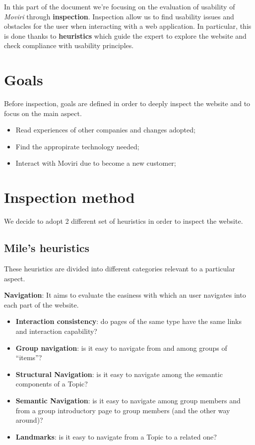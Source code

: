 In this part of the document we're focusing on the evaluation of usability of \textit{Moviri} through \textbf{inspection}. Inspection allow us to find usability issues and obstacles for the user when interacting with a web application. In particular, this is done thanks to \textbf{heuristics} which guide the expert to explore the website and check compliance with usability principles.
\section{Goals}
Before inspection, goals are defined in order to deeply inspect the website and to focus on the main aspect. 
\begin{itemize}
\item Read experiences of other companies and changes adopted;
\item Find the appropirate technology needed;
\item Interact with Moviri due to become a new customer;
\end{itemize}
\section{Inspection method}

We decide to adopt 2 different set of heuristics in order to inspect the website. 

\subsection{Mile's heuristics}
These heuristics are divided into different categories relevant to a particular aspect.

\textbf{Navigation}: It aims to evaluate the easiness with which an user navigates into each part of the website.
\begin{itemize} 
\item \textbf{Interaction consistency}: do pages of the same type have the same links and interaction capability?
\item \textbf{Group navigation}: is it easy to navigate from and among groups of
“items”?
\item \textbf{Structural Navigation}: is it easy to navigate among the semantic components of a Topic?
\item \textbf{Semantic Navigation}: is it easy to navigate among group members and from a group introductory page to group members (and the other way around)?
\item \textbf{Landmarks}: is it easy to navigate from a Topic to a related one?
\end{itemize}

